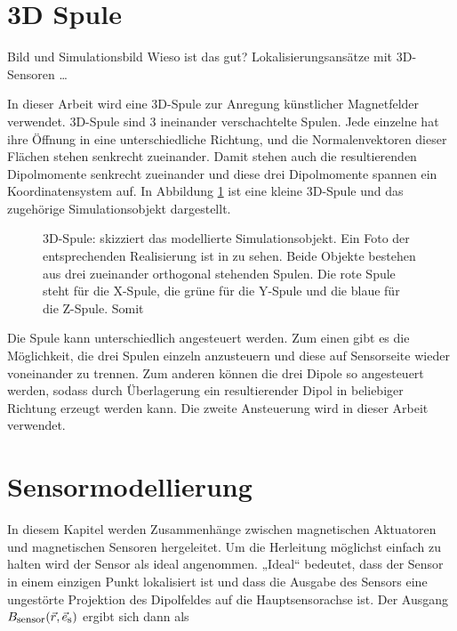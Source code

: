 \section{3D Spule}
Bild und Simulationsbild
Wieso ist das gut? Lokalisierungsansätze mit 3D- Sensoren \dots

In dieser Arbeit wird eine 3D-Spule zur Anregung künstlicher Magnetfelder verwendet. 3D-Spule sind 3 ineinander verschachtelte Spulen. Jede einzelne hat ihre Öffnung in eine unterschiedliche Richtung, und die Normalenvektoren dieser Flächen stehen senkrecht zueinander. Damit stehen auch die resultierenden Dipolmomente senkrecht zueinander und diese drei Dipolmomente spannen ein Koordinatensystem auf. In Abbildung \ref{fig:3DCoil} ist eine kleine 3D-Spule und das zugehörige Simulationsobjekt dargestellt. 

\begin{figure}
    \centering
    \caption{3D-Spule:  skizziert das modellierte Simulationsobjekt. Ein Foto der entsprechenden Realisierung ist in  zu sehen. Beide Objekte bestehen aus drei zueinander orthogonal stehenden Spulen. Die rote Spule steht für die X-Spule, die grüne für die Y-Spule und die blaue für die Z-Spule. Somit  }
    \label{fig:3DCoil}
\end{figure}

Die Spule kann unterschiedlich angesteuert werden. Zum einen gibt es die Möglichkeit, die drei Spulen einzeln anzusteuern und diese auf Sensorseite wieder voneinander zu trennen. Zum anderen können die drei Dipole so angesteuert werden, sodass durch Überlagerung ein resultierender Dipol in beliebiger Richtung erzeugt werden kann. Die zweite Ansteuerung wird in dieser Arbeit verwendet.

\section{Sensormodellierung}
In diesem Kapitel werden Zusammenhänge zwischen magnetischen Aktuatoren und magnetischen Sensoren hergeleitet. Um die Herleitung möglichst einfach zu halten wird der Sensor als ideal angenommen. „Ideal“ bedeutet, dass der Sensor in einem einzigen Punkt lokalisiert ist und dass die Ausgabe des Sensors eine ungestörte Projektion des Dipolfeldes auf die Hauptsensorachse ist. Der Ausgang $B_{\textrm{\footnotesize{sensor}}}(\vec{r},\vec{e}_{\textrm{\footnotesize{s}}})$ ergibt sich dann als

